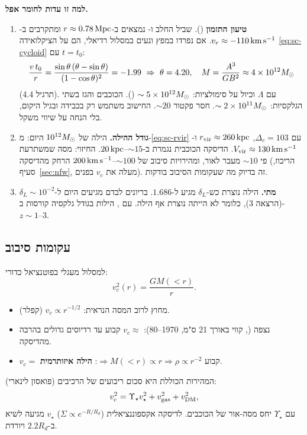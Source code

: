 \begin{keybox}
\textbf{למה זו עדות לחומר אפל.}
\begin{enumerate}
\item \textbf{טיעון התזמון} (). שביל החלב ו- נמצאים ב-$r\approx0.78\,\mathrm{Mpc}$ ומתקרבים ב-$v_r\approx-110\,\mathrm{km\,s^{-1}}$. אם נפרדו במפץ ונעים במסלול רדיאלי, הם על הציקלואידה \eqref{eq:sc-cycloid} עם $t=t_0$:
\begin{equation}
\frac{v\,t_0}{r}=\frac{\sin\theta\,(\theta-\sin\theta)}{(1-\cos\theta)^2}=-1.99
\ \Rightarrow\ \theta=4.20,\quad M=\frac{A^3}{GB^2}\approx4\times10^{12}M_{\odot}
\end{equation}
(תרגיל 4.4). עם $\Lambda$ וכיול על סימולציות: $\sim5\times10^{12}M_{\odot}$ (). הכוכבים והגז בשתי הגלקסיות: $\sim2\times10^{11}M_{\odot}$. חסר פקטור $\sim20$. החישוב משתמש רק בכבידה ובגיל היקום, בלי הנחה על שיווי משקל.
\item \textbf{גודל ההילה.} הילה של $10^{12}M_{\odot}$ היום: מ-\eqref{eq:sc-rvir} עם $\Delta_c=103$, $r_{\rm vir}\approx260\,\mathrm{kpc}$ ו-$V_{\rm vir}\approx130\,\mathrm{km\,s^{-1}}$. הדיסקה הכוכבית נגמרת ב-$\sim15$--$20\,\mathrm{kpc}$. החיזוי: מסה שמשתרעת פי $\sim10$ מעבר לאור, ומהירויות סיבוב של $\sim100$--$200\,\mathrm{km\,s^{-1}}$ הרחק מהדיסקה (הריכוז, סעיף~\ref{sec:nfw}, מעלה את $v_c$ בפנים). זה בדיוק מה שעקומות הסיבוב בודקות.
\item \textbf{מתי.} הילה נוצרת כש-$\delta_L$ מגיע ל-$1.686$. בריונים לבדם מגיעים היום ל-$\delta_L\sim10^{-2}$ (הרצאה 3), כלומר לא הייתה נוצרת אף הילה. עם , הילות בגודל גלקסיה קורסות ב-$z\sim1$--$3$.
\end{enumerate}
\end{keybox}

\subsection{עקומות סיבוב}
למסלול מעגלי בפוטנציאל כדורי:
\begin{equation}
v_c^2(r)=\frac{GM(<r)}{r}.
\end{equation}
\begin{itemize}
\item מחוץ לרוב המסה הנראית: $v_c\propto r^{-1/2}$ (קפלר).
\item נצפה (, קווי  באורך 21 ס"מ, 1970--80): $v_c\approx$ קבוע עד רדיוסים גדולים בהרבה מהדיסקה.
\item $v_c=$ קבוע $\Rightarrow M(<r)\propto r\Rightarrow\rho\propto r^{-2}$: \textbf{הילה איזותרמית}.
\end{itemize}
המהירות הכוללת היא סכום ריבועים של הרכיבים (פואסון לינארי):
\begin{equation}
v_c^2=\Upsilon_\star v_\star^2+v_{\rm gas}^2+v_{\rm DM}^2,
\end{equation}
עם $\Upsilon_\star$ יחס מסה-אור של הכוכבים. לדיסקה אקספוננציאלית ($\Sigma\propto e^{-R/R_d}$) $v_\star$ מגיעה לשיא ב-$2.2R_d$ ויורדת.

